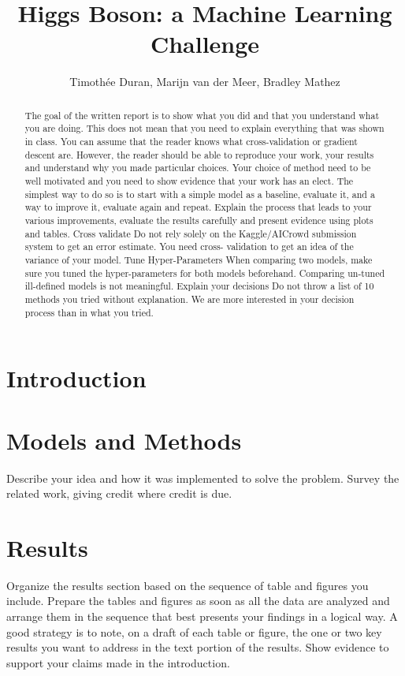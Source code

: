 \documentclass[10pt,conference,compsocconf]{IEEEtran}
\begin{document}
\title{Higgs Boson: a Machine Learning Challenge}

\author{
  Timothée Duran, Marijn van der Meer, Bradley Mathez
}

\maketitle

\begin{abstract}

 The goal of the written report is to show what you did and that you understand what you are doing. This does
not mean that you need to explain everything that was shown in class. You can assume that the reader knows
what cross-validation or gradient descent are. However, the reader should be able to reproduce your work, your
results and understand why you made particular choices. Your choice of method need to be well motivated and
you need to show evidence that your work has an elect.
The simplest way to do so is to start with a simple model as a baseline, evaluate it, and a way to improve it,
evaluate again and repeat. Explain the process that leads to your various improvements, evaluate the results
carefully and present evidence using plots and tables.
Cross validate
Do not rely solely on the Kaggle/AICrowd submission system to get an error estimate. You need cross-
validation to get an idea of the variance of your model.
Tune Hyper-Parameters
When comparing two models, make sure you tuned the hyper-parameters for both models beforehand.
Comparing un-tuned \/ ill-defined models is not meaningful.
Explain your decisions
Do not throw a list of 10 methods you tried without explanation. We are more interested in your decision
process than in what you tried.
\end{abstract}

\section{Introduction}\label{sec: introduction}

\section{Models and Methods}\label{sec: models_methods}
Describe your idea and how it was implemented to solve
  the problem. Survey the related work, giving credit where credit is
  due.
\section{Results}\label{sec: results}
Organize the results section based on the sequence of table and
figures you include. Prepare the tables and figures as soon as all
the data are analyzed and arrange them in the sequence that best
presents your findings in a logical way. A good strategy is to note,
on a draft of each table or figure, the one or two key results you
want to address in the text portion of the results.
Show evidence to support your claims made in the
  introduction.
\end{document}
